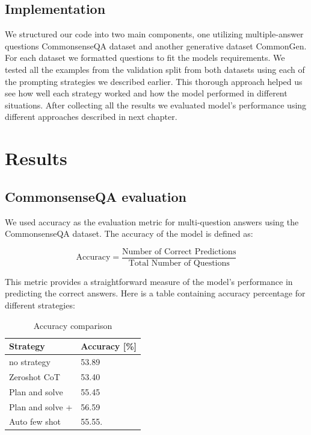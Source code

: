 \documentclass[fleqn,moreauthors,10pt]{ds_report}
\begin{document}
\subsection*{Implementation}
We structured our code into two main components, one utilizing multiple-answer questions CommonsenseQA dataset and another generative dataset CommonGen.
\newline
For each dataset we formatted questions to fit the models requirements. 
We tested all the examples from the validation split from both datasets using each of the prompting strategies we described earlier. This thorough approach helped us see how well each strategy worked and how the model performed in different situations. After collecting all the results we evaluated model's performance using different approaches described in next chapter.





\section*{Results}
\subsection*{CommonsenseQA evaluation}
We used accuracy as the evaluation metric for multi-question answers using the CommonsenseQA dataset. 
The accuracy of the model is defined as:

\begin{equation}
\text{Accuracy} = \frac{\text{Number of Correct Predictions}}{\text{Total Number of Questions}}
\end{equation}

This metric provides a straightforward measure of the model's performance in predicting the correct answers. Here is a table containing accuracy percentage for different strategies:

\begin{table}[h!]
\centering
\begin{tabular}{@{}ll@{}}
\toprule
\textbf{Strategy} & \textbf{Accuracy [\%]} \\ \midrule
no strategy & 53.89 \\
Zeroshot CoT & 53.40 \\
Plan and solve & 55.45 \\
Plan and solve + & 56.59 \\
Auto few shot  & 55.55. \\ \bottomrule
\end{tabular}
\caption{Accuracy comparison}
\label{tab:example}
\end{table}
\end{document}
